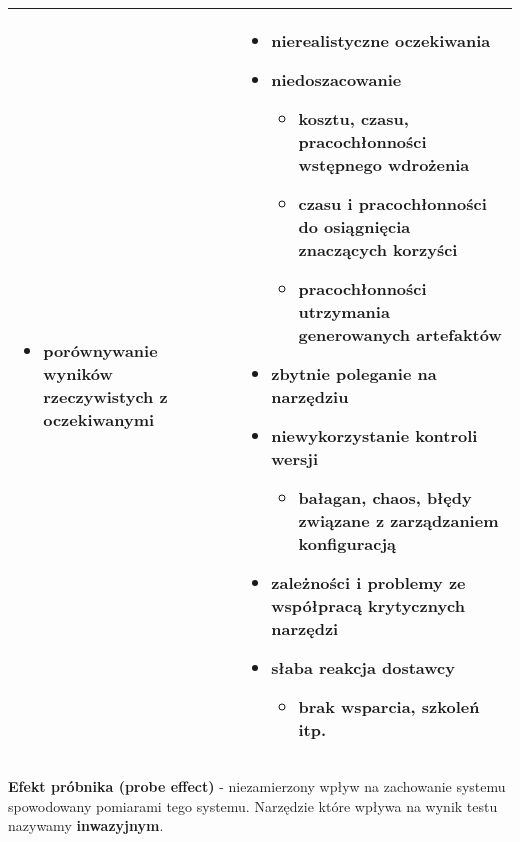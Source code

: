 \documentclass[../main.tex]{subfiles}
\begin{document}
\begin{table}[H]
\begin{center}
\begin{tabular}{| p{8cm} | p{8cm} |}
\begin{itemize}
\begin{itemize}
                    \end{itemize}
                    \item \textbf{porównywanie wyników} rzeczywistych z oczekiwanymi
                \end{itemize}
                &
                \begin{itemize}
                    \item \textbf{nierealistyczne oczekiwania}
                    \item \textbf{niedoszacowanie}
                    \begin{itemize}
                        \item kosztu, czasu, pracochłonności wstępnego wdrożenia
                        \item czasu i pracochłonności do osiągnięcia znaczących korzyści
                        \item pracochłonności utrzymania generowanych artefaktów
                    \end{itemize}
                    \item \textbf{zbytnie poleganie na narzędziu}
                    \item \textbf{niewykorzystanie kontroli wersji}
                    \begin{itemize}
                        \item bałagan, chaos, błędy związane z zarządzaniem konfiguracją
                    \end{itemize}
                    \item zależności i \textbf{problemy ze współpracą} krytycznych narzędzi
                    \item słaba reakcja dostawcy
                    \begin{itemize}
                        \item brak wsparcia, szkoleń itp.
                    \end{itemize}
                \end{itemize}\\
                \hline
            \end{tabular}
        \end{center}
    \end{table}


    \textbf{Efekt próbnika (probe effect)} - niezamierzony wpływ na zachowanie systemu spowodowany pomiarami tego systemu.
    Narzędzie które wpływa na wynik testu nazywamy \textbf{inwazyjnym}.
\end{document}
